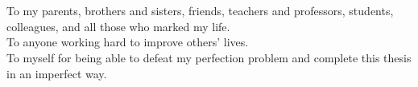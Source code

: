 \chapter*{}

\vspace*{\fill}

\begin{flushright}
	\begin{minipage}[]{7cm}
	To my parents, brothers and sisters, friends, teachers and professors, students, colleagues, and all those who marked my life.\\[.1cm]
	
	To anyone working hard to improve others' lives.\\[.1cm]
	
	To myself for being able to defeat my perfection problem and complete this thesis in an imperfect way. 
\end{minipage}
\end{flushright}

